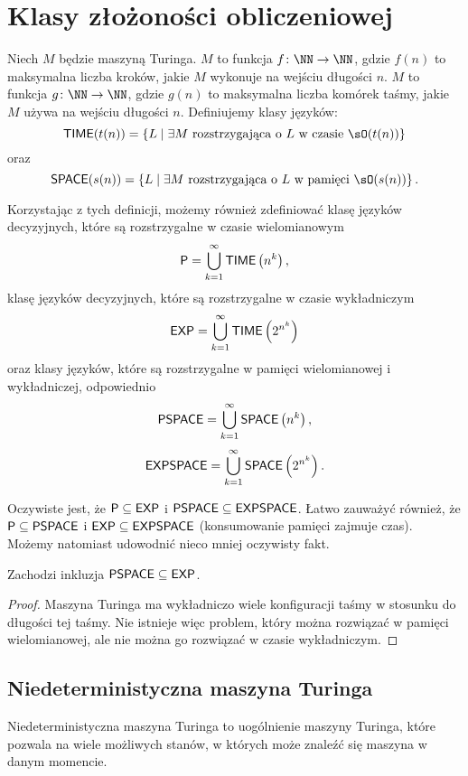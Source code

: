 \section{Klasy złożoności obliczeniowej}

Niech $M$ będzie maszyną Turinga.  $M$ to funkcja $f\colon \NN \to \NN$, gdzie $f(n)$ to maksymalna liczba kroków, jakie $M$ wykonuje na wejściu długości $n$.  $M$ to funkcja $g\colon \NN \to \NN$, gdzie $g(n)$ to maksymalna liczba komórek taśmy, jakie $M$ używa na wejściu długości $n$. Definiujemy klasy języków:
\[ \TIME(t(n)) = \left\{ L \mid \exists M \text{ rozstrzygająca o } L \text{ w czasie } \sO(t(n)) \right\} \]
oraz
\[ \SPACE(s(n)) = \left\{ L \mid \exists M \text{ rozstrzygająca o } L \text{ w pamięci } \sO(s(n)) \right\}. \]

Korzystając z tych definicji, możemy również zdefiniować klasę języków decyzyjnych, które są rozstrzygalne w czasie wielomianowym
\[ \textsf{P} = \bigcup_{k = 1}^\infty \textsf{TIME}\left(n^k\right), \]
klasę języków decyzyjnych, które są rozstrzygalne w czasie wykładniczym
\[ \textsf{EXP} = \bigcup_{k = 1}^\infty \textsf{TIME}\left(2^{n^k}\right) \]
oraz klasy języków, które są rozstrzygalne w pamięci wielomianowej i wykładniczej, odpowiednio
\[ \textsf{PSPACE} = \bigcup_{k = 1}^\infty \textsf{SPACE}\left(n^k\right), \]
\[ \textsf{EXPSPACE} = \bigcup_{k = 1}^\infty \textsf{SPACE}\left(2^{n^k}\right). \]

Oczywiste jest, że $\textsf{P} \subseteq \textsf{EXP}$ i $\textsf{PSPACE} \subseteq \textsf{EXPSPACE}$. Łatwo zauważyć również, że $\textsf{P} \subseteq \textsf{PSPACE}$ i $\textsf{EXP} \subseteq \textsf{EXPSPACE}$ (konsumowanie pamięci zajmuje czas). Możemy natomiast udowodnić nieco mniej oczywisty fakt.
\begin{fact}
    Zachodzi inkluzja $\textsf{PSPACE} \subseteq \textsf{EXP}$.
\end{fact}
\begin{proof}
    Maszyna Turinga ma wykładniczo wiele konfiguracji taśmy w stosunku do długości tej taśmy. Nie istnieje więc problem, który można rozwiązać w pamięci wielomianowej, ale nie można go rozwiązać w czasie wykładniczym.
\end{proof}

\subsection{Niedeterministyczna maszyna Turinga}

Niedeterministyczna maszyna Turinga to uogólnienie maszyny Turinga, które pozwala na wiele możliwych stanów, w których może znaleźć się maszyna w danym momencie.

